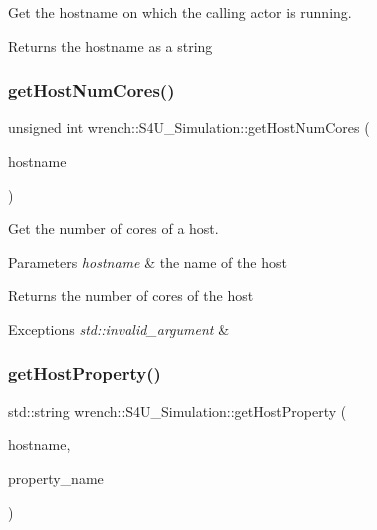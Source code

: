 Get the hostname on which the calling actor is running. 

\begin{DoxyReturn}{Returns}
the hostname as a string 
\end{DoxyReturn}
\mbox{\label{classwrench_1_1_s4_u___simulation_a1f64ef3a7e311e360ce7581e051b58fd}} 
\subsubsection{\texorpdfstring{get\+Host\+Num\+Cores()}{getHostNumCores()}}
{\footnotesize\ttfamily unsigned int wrench\+::\+S4\+U\+\_\+\+Simulation\+::get\+Host\+Num\+Cores (\begin{DoxyParamCaption}\item[{std\+::string}]{hostname }\end{DoxyParamCaption})\hspace{0.3cm}{\ttfamily [static]}}



Get the number of cores of a host. 


\begin{DoxyParams}{Parameters}
{\em hostname} & the name of the host \\
\hline
\end{DoxyParams}
\begin{DoxyReturn}{Returns}
the number of cores of the host
\end{DoxyReturn}

\begin{DoxyExceptions}{Exceptions}
{\em std\+::invalid\+\_\+argument} & \\
\hline
\end{DoxyExceptions}
\mbox{\label{classwrench_1_1_s4_u___simulation_a5321cc7b90ea82a95357695cad1b8370}} 
\subsubsection{\texorpdfstring{get\+Host\+Property()}{getHostProperty()}}
{\footnotesize\ttfamily std\+::string wrench\+::\+S4\+U\+\_\+\+Simulation\+::get\+Host\+Property (\begin{DoxyParamCaption}\item[{std\+::string}]{hostname,  }\item[{std\+::string}]{property\+\_\+name }\end{DoxyParamCaption})\hspace{0.3cm}{\ttfamily [static]}}



